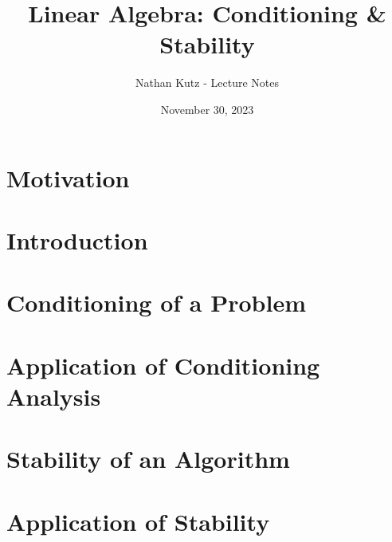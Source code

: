 \documentclass{tufte-handout}
\title{Linear Algebra: Conditioning \& Stability}
\author{Nathan Kutz - Lecture Notes}
\date{November 30, 2023}
\begin{document}
	\maketitle
	
	
	\section{Motivation}
	\label{sec: motivation}
	
	
	\section{Introduction}
	\label{sec: introduction}
	
	
	\newpage
	
	\section{Conditioning of a Problem}
	\label{sec: conditioning}
	
		
	\section{Application of Conditioning Analysis}
	\label{sec: conditioning app}
			


	\section{Stability of an Algorithm}
	\label{sec: stability}
	

	\section{Application of Stability}
	\label{sec: stability_app}
	

		
	
	
\end{document}
